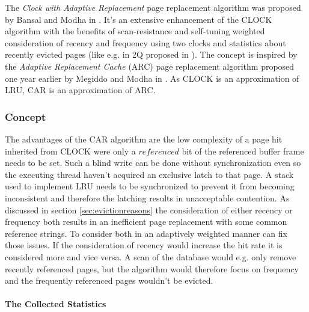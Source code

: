     The \emph{Clock with Adaptive Replacement} page replacement algorithm was proposed by Bansal and Modha in \cite{Bansal:2004}. It's an extensive enhancement of the CLOCK algorithm with the benefits of scan-resistance and self-tuning weighted consideration of recency and frequency using two clocks and statistics about recently evicted pages (like e.g. in 2Q proposed in \cite{Johnson:1994}). The concept is inspired by the \emph{Adaptive Replacement Cache} (ARC) page replacement algorithm proposed one year earlier by Megiddo and Modha in \cite{Megiddo:2003}. As CLOCK is an approximation of LRU, CAR is an approximation of ARC.

\subsubsection{Concept}

        The advantages of the CAR algorithm are the low complexity of a page hit inherited from CLOCK were only a $referenced$ bit of the referenced buffer frame needs to be set. Such a blind write can be done without synchronization even so the executing thread haven't acquired an exclusive latch to that page. A stack used to implement LRU needs to be synchronized to prevent it from becoming inconsistent and therefore the latching results in unacceptable contention. As discussed in section \ref{sec:evictionreasons} the consideration of either recency or frequency both results in an inefficient page replacement with some common reference strings. To consider both in an adaptively weighted manner can fix those issues. If the consideration of recency would increase the hit rate it is considered more and vice versa. A scan of the database would e.g. only remove recently referenced pages, but the algorithm would therefore focus on frequency and the frequently referenced pages wouldn't be evicted.

\paragraph{The Collected Statistics}

